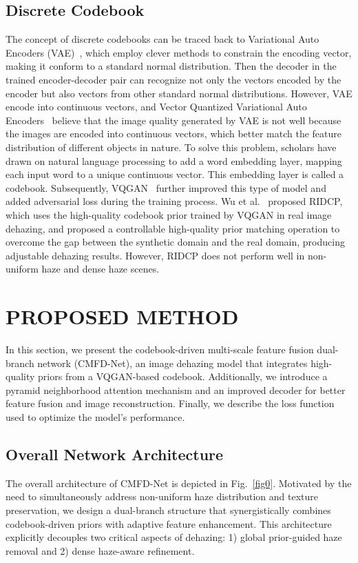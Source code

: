 \documentclass[journal]{IEEEtran}
\begin{document}
\subsection{Discrete Codebook}
The concept of discrete codebooks can be traced back to Variational Auto Encoders (VAE)~\cite{kingma2013auto}, which employ clever methods to constrain the encoding vector, making it conform to a standard normal distribution. Then the decoder in the trained encoder-decoder pair can recognize not only the vectors encoded by the encoder but also vectors from other standard normal distributions. However, VAE encode into continuous vectors, and Vector Quantized Variational Auto Encoders~\cite{van2017neural} believe that the image quality generated by VAE is not well because the images are encoded into continuous vectors, which better match the feature distribution of different objects in nature. To solve this problem, scholars have drawn on natural language processing to add a word embedding layer, mapping each input word to a unique continuous vector. This embedding layer is called a codebook. Subsequently, VQGAN~\cite{esser2021taming} further improved this type of model and added adversarial loss during the training process. Wu et al.~\cite{wu2023ridcp} proposed RIDCP, which uses the high-quality codebook prior trained by VQGAN in real image dehazing, and proposed a controllable high-quality prior matching operation to overcome the gap between the synthetic domain and the real domain, producing adjustable dehazing results. However, RIDCP does not perform well in non-uniform haze and dense haze scenes.



\section{PROPOSED METHOD}

In this section, we present the codebook-driven multi-scale feature fusion dual-branch network (CMFD-Net), an image dehazing model that integrates high-quality priors from a VQGAN-based codebook. Additionally, we introduce a pyramid neighborhood attention mechanism and an improved decoder for better feature fusion and image reconstruction. Finally, we describe the loss function used to optimize the model’s performance.

\subsection{Overall Network Architecture}
The overall architecture of CMFD-Net is depicted in Fig.~\ref{fig0}. Motivated by the need to simultaneously address non-uniform haze distribution and texture preservation, we design a dual-branch structure that synergistically combines codebook-driven priors with adaptive feature enhancement. This architecture explicitly decouples two critical aspects of dehazing: 1) global prior-guided haze removal and 2) dense haze-aware refinement.
\end{document}
